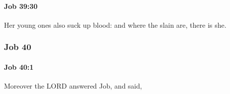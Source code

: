 		\paragraph{Job 39:30} %
			\label{JOB-39-30}

			Her young ones also suck up blood: and where the slain are, there is she.

	\subsubsection{Job 40} %
		\label{JOB-40}

		\paragraph{Job 40:1} %
			\label{JOB-40-1}

			Moreover the LORD answered Job, and said,


